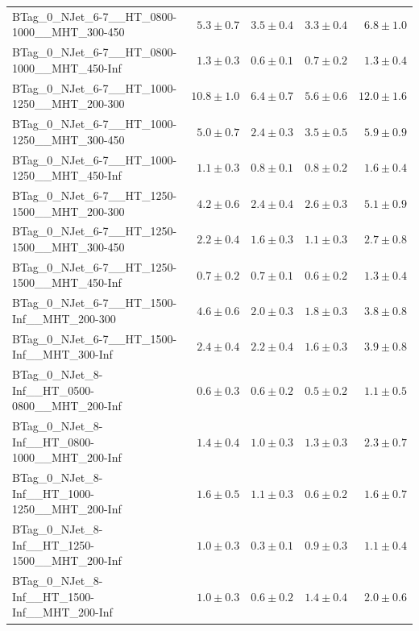 \documentclass{beamer}
\begin{document}
\begin{frame}
\begin{tabular}{lrrrr}
      BTag\_0\_NJet\_6-7\_\_HT\_0800-1000\_\_MHT\_300-450 &               $5.3\pm0.7$&               $3.5\pm0.4$&               $3.3\pm0.4$&                   $6.8\pm1.0$ \\ 
      BTag\_0\_NJet\_6-7\_\_HT\_0800-1000\_\_MHT\_450-Inf &               $1.3\pm0.3$&               $0.6\pm0.1$&               $0.7\pm0.2$&                   $1.3\pm0.4$ \\ 
      BTag\_0\_NJet\_6-7\_\_HT\_1000-1250\_\_MHT\_200-300 &              $10.8\pm1.0$&               $6.4\pm0.7$&               $5.6\pm0.6$&                  $12.0\pm1.6$ \\ 
      BTag\_0\_NJet\_6-7\_\_HT\_1000-1250\_\_MHT\_300-450 &               $5.0\pm0.7$&               $2.4\pm0.3$&               $3.5\pm0.5$&                   $5.9\pm0.9$ \\ 
      BTag\_0\_NJet\_6-7\_\_HT\_1000-1250\_\_MHT\_450-Inf &               $1.1\pm0.3$&               $0.8\pm0.1$&               $0.8\pm0.2$&                   $1.6\pm0.4$ \\ 
      BTag\_0\_NJet\_6-7\_\_HT\_1250-1500\_\_MHT\_200-300 &               $4.2\pm0.6$&               $2.4\pm0.4$&               $2.6\pm0.3$&                   $5.1\pm0.9$ \\ 
      BTag\_0\_NJet\_6-7\_\_HT\_1250-1500\_\_MHT\_300-450 &               $2.2\pm0.4$&               $1.6\pm0.3$&               $1.1\pm0.3$&                   $2.7\pm0.8$ \\ 
      BTag\_0\_NJet\_6-7\_\_HT\_1250-1500\_\_MHT\_450-Inf &               $0.7\pm0.2$&               $0.7\pm0.1$&               $0.6\pm0.2$&                   $1.3\pm0.4$ \\ 
       BTag\_0\_NJet\_6-7\_\_HT\_1500-Inf\_\_MHT\_200-300 &               $4.6\pm0.6$&               $2.0\pm0.3$&               $1.8\pm0.3$&                   $3.8\pm0.8$ \\ 
       BTag\_0\_NJet\_6-7\_\_HT\_1500-Inf\_\_MHT\_300-Inf &               $2.4\pm0.4$&               $2.2\pm0.4$&               $1.6\pm0.3$&                   $3.9\pm0.8$ \\ 
    BTag\_0\_NJet\_8-Inf\_\_HT\_0500-0800\_\_MHT\_200-Inf &               $0.6\pm0.3$&               $0.6\pm0.2$&               $0.5\pm0.2$&                   $1.1\pm0.5$ \\ 
    BTag\_0\_NJet\_8-Inf\_\_HT\_0800-1000\_\_MHT\_200-Inf &               $1.4\pm0.4$&               $1.0\pm0.3$&               $1.3\pm0.3$&                   $2.3\pm0.7$ \\ 
    BTag\_0\_NJet\_8-Inf\_\_HT\_1000-1250\_\_MHT\_200-Inf &               $1.6\pm0.5$&               $1.1\pm0.3$&               $0.6\pm0.2$&                   $1.6\pm0.7$ \\ 
    BTag\_0\_NJet\_8-Inf\_\_HT\_1250-1500\_\_MHT\_200-Inf &               $1.0\pm0.3$&               $0.3\pm0.1$&               $0.9\pm0.3$&                   $1.1\pm0.4$ \\ 
     BTag\_0\_NJet\_8-Inf\_\_HT\_1500-Inf\_\_MHT\_200-Inf &               $1.0\pm0.3$&               $0.6\pm0.2$&               $1.4\pm0.4$&                   $2.0\pm0.6$ \\ 


\end{tabular}
\end{frame}
\end{document}
